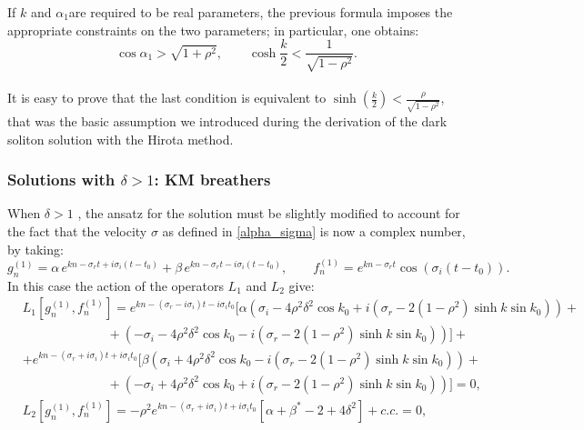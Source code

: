 \documentclass{article}
\begin{document}
If $k $ and $\alpha_1$are required to be real parameters, the previous formula imposes the appropriate constraints on the two parameters; in particular, one obtains:
\begin{equation}
    \cos\alpha_1>\sqrt{1+\rho^2}, \qquad \cosh\frac{k}{2}<\frac{1}{\sqrt{1-\rho^2}}.
\end{equation}\\
It is easy to prove that the last condition is equivalent to $ \sinh\left(\frac{k}{2}\right)<\frac{\rho}{  \sqrt{1-\rho^2}}$, that was the basic assumption we introduced during the derivation of the dark soliton solution with the Hirota method.
\subsubsection{Solutions with $\delta>1$: KM breathers}
When $\delta>1$ , the ansatz for the solution must be slightly modified to account for the fact that the velocity $\sigma$ as defined in \eqref{alpha_sigma} is now a complex number, by taking:
\begin{equation}\label{linear_Hirota_def}
    g^{(1)}_n=\alpha \,e^{k n-\sigma_r t+i\sigma_i (t-t_0)}+\beta \,e^{k n-\sigma_r t-i\sigma_i (t-t_0)}, \qquad  f^{(1)}_n=e^{k n-\sigma_r t}\cos(\sigma_i (t-t_0)).
\end{equation}
In this case the action of the operators $L_1$ and $L_2$ give:
\begin{equation}
\begin{split}
    &L_1[g_n^{(1)},f_n^{(1)}]=e^{kn-(\sigma_r-i\sigma_i) t-i \sigma_i t_0}\bigg[ \alpha\left(\sigma_i-4\rho^2\delta^2\cos k_0+i(\sigma_r-2(1-\rho^2)\sinh k\sin k_0)\right)+ \\
    &\   \ \ \ \  \  \ \ \ \ \ \ \  \  \ \ \ \  \  \  \  \  \  \   \   \  \ \  \ \ +\left(-\sigma_i-4\rho^2\delta^2\cos k_0-i(\sigma_r-2(1-\rho^2)\sinh k\sin k_0)\right) \bigg] +\\[2mm]
    &+e^{kn-(\sigma_r+i\sigma_i) t+ i\sigma_i t_0}\bigg[ \beta\left(\sigma_i+4\rho^2\delta^2\cos k_0-i(\sigma_r-2(1-\rho^2)\sinh k\sin k_0)\right)+ \\
    &\   \ \ \ \  \  \ \ \ \ \ \ \  \  \ \ \ \  \  \  \  \  \  \   \   \  \ \  \ \ +\left(-\sigma_i+4\rho^2\delta^2\cos k_0+i(\sigma_r-2(1-\rho^2)\sinh k\sin k_0)\right) \bigg]=0, \\[2mm]
   & L_2[g_n^{(1)},f_n^{(1)}]=-\rho^2e^{kn-(\sigma_r+i\sigma_i) t+ i\sigma_i t_0}\left[  \alpha+\beta^*-2+4\delta^2 \right]+c.c.=0,
  \end{split}  
\end{equation}
\end{document}

